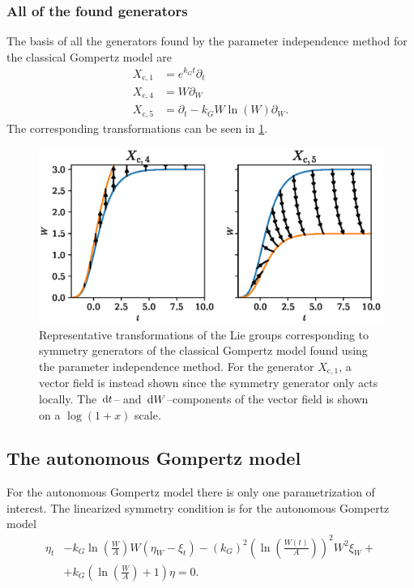 \subsubsection{All of the found generators}
The basis of all the generators found by the parameter independence method for the classical Gompertz model are
\begin{align*}
  X_{\text{c},1} &= e^{k_G t} \partial_t \\
  X_{\text{c},4} &= W \partial_W \\
  X_{\text{c},5} &= \partial_t - k_G W \ln\left(W\right) \partial_W.
\end{align*}
The corresponding transformations can be seen in \cref{fig:gompertz-classical-param}.
\begin{figure}
  \centering
  \includegraphics[width=.6517\textwidth]{images/gompertz-classical-param}
  \caption{
    Representative transformations of the Lie groups corresponding to symmetry generators of the classical Gompertz model found using the parameter independence method.
    For the generator \(X_{\text{c},1}\), a vector field is instead shown since the symmetry generator only acts locally.
    The \(\dl t\)-- and \(\dl W\)--components of the vector field is shown on a \(\log(1 + x)\) scale.
  }
  \label{fig:gompertz-classical-param}
\end{figure}


\subsection{The autonomous Gompertz model}

For the autonomous Gompertz model there is only one parametrization of interest.
The linearized symmetry condition  is for the autonomous Gompertz model
\begin{equation}\label{eq:gompertz-autonomous-lin-symmetry-cond}
  \begin{split}
    \eta_t &- k_G \ln\left(\frac{W}{A}\right) W\left(\eta_W - \xi_t\right) - (k_G)^2 \left(\ln\left(\frac{W(t)}{A}\right)\right)^2 W^2 \xi_W +\\ &+ k_G \left(\ln\left(\frac{W}{A}\right) + 1\right) \eta = 0.
  \end{split}
\end{equation}

